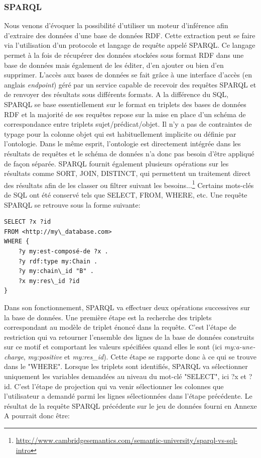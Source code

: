 \subsubsection{SPARQL} \label{sparql}

Nous venons d'évoquer la possibilité d'utiliser un moteur d'inférence afin d'extraire des données d'une base de données RDF. Cette extraction peut se faire via l'utilisation d'un protocole et langage de requête appelé SPARQL. Ce langage permet à la fois de récupérer des données stockées sous format RDF dans une base de données mais également de les éditer, d'en ajouter ou bien d'en supprimer. L'accès aux bases de données se fait grâce à une interface d'accès (en anglais \textit{endpoint}) géré par un service capable de recevoir des requêtes SPARQL et de renvoyer des résultats sous différents formats.
A la différence du SQL, SPARQL se base essentiellement sur le format en triplets des bases de données RDF et la majorité de ses requêtes repose sur la mise en place d'un schéma de correspondance entre triplets sujet/prédicat/objet. Il n'y a pas de contraintes de typage pour la colonne objet qui est habituellement implicite ou définie par l'ontologie. Dans le même esprit, l'ontologie est directement intégrée dans les résultats de requêtes et le schéma de données n'a donc pas besoin d'être appliqué de façon séparée. SPARQL fournit également plusieurs opérations sur les résultats comme SORT, JOIN, DISTINCT, qui permettent un traitement direct des résultats afin de les classer ou filtrer suivant les besoins...\footnote{\url{http://www.cambridgesemantics.com/semantic-university/sparql-vs-sql-intro}} Certains mots-clés de SQL ont été conservé tels que SELECT, FROM, WHERE, etc.
Une requête SPARQL se retrouve sous la forme suivante:

\begin{lstlisting}[language=SPARQL]
SELECT ?x ?id
FROM <http://my\_database.com> 
WHERE {
	?y my:est-composé-de ?x .
	?y rdf:type my:Chain .
	?y my:chain\_id "B" .
	?x my:res\_id ?id
}
\end{lstlisting}

Dans son fonctionnement, SPARQL va effectuer deux opérations successives sur la base de données. Une première étape est la recherche des triplets correspondant au modèle de triplet énoncé dans la requête. C'est l'étape de restriction qui va retourner l'ensemble des lignes de la base de données construits sur ce motif et comportant les valeurs spécifiées quand elles le sont (ici \textit{my:a-une-charge}, \textit{my:positive} et \textit{my:res\_id}). Cette étape se rapporte donc à ce qui se trouve dans le "WHERE". Lorsque les triplets sont identifiés, SPARQL va sélectionner uniquement les variables demandées au niveau du mot-clé "SELECT", ici ?x et ?id. C'est l'étape de projection qui va venir sélectionner les colonnes que l'utilisateur a demandé parmi les lignes sélectionnées dans l'étape précédente. Le résultat de la requête SPARQL précédente sur le jeu de données fourni en Annexe A pourrait donc être:

